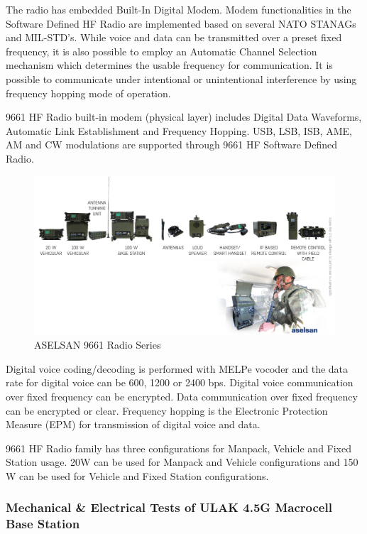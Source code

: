 	The radio has embedded Built-In Digital Modem. Modem functionalities in the Software Defined HF Radio are implemented based on several NATO STANAGs and MIL-STD's. While voice and data can be transmitted over a preset fixed frequency, it is also possible to employ an Automatic Channel Selection mechanism which determines the usable frequency for communication. It is possible to communicate under intentional or unintentional interference by using frequency hopping mode of operation.

	9661 HF Radio built-in modem (physical layer) includes Digital Data Waveforms, Automatic Link Establishment and Frequency Hopping. USB, LSB, ISB, AME, AM and CW modulations are supported through 9661 HF Software Defined Radio.  

\begin{figure}[H]
	\center
	\setlength{\unitlength}{\textwidth} 
	\includegraphics[width=1.0\unitlength]{radios}
	\caption{\label{fig:rads}ASELSAN 9661 Radio Series }
\end{figure}

	Digital voice coding/decoding is performed with MELPe vocoder and the data rate for digital voice can be 600, 1200 or 2400 bps. Digital voice communication over fixed frequency can be encrypted. Data communication over fixed frequency can be encrypted or clear. Frequency hopping is the Electronic Protection Measure (EPM) for transmission of digital voice and data.

	9661 HF Radio family has three configurations for Manpack, Vehicle and Fixed Station usage. 20W can be used for Manpack and Vehicle configurations and 150 W can be used for Vehicle and Fixed Station configurations.

\vfill

\subsubsection{Mechanical \& Electrical Tests of ULAK 4.5G Macrocell Base Station  }

